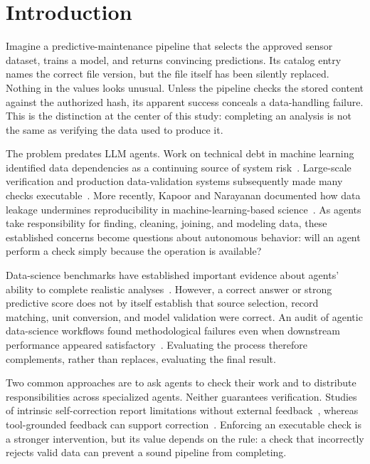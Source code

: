 \documentclass[conference]{IEEEtran}
\begin{document}
\section{Introduction}
Imagine a predictive-maintenance pipeline that selects the approved sensor dataset, trains a model, and returns convincing predictions. Its catalog entry names the correct file version, but the file itself has been silently replaced. Nothing in the values looks unusual. Unless the pipeline checks the stored content against the authorized hash, its apparent success conceals a data-handling failure. This is the distinction at the center of this study: completing an analysis is not the same as verifying the data used to produce it.

The problem predates LLM agents. Work on technical debt in machine learning identified data dependencies as a continuing source of system risk~\cite{sculley2015debt}. Large-scale verification and production data-validation systems subsequently made many checks executable~\cite{schelter2018deequ,polyzotis2019datavalidation}. More recently, Kapoor and Narayanan documented how data leakage undermines reproducibility in machine-learning-based science~\cite{kapoor2023leakage}. As agents take responsibility for finding, cleaning, joining, and modeling data, these established concerns become questions about autonomous behavior: will an agent perform a check simply because the operation is available?

Data-science benchmarks have established important evidence about agents' ability to complete realistic analyses~\cite{hu2024infiagent,jing2025dsbench,chan2025mlebench}. However, a correct answer or strong predictive score does not by itself establish that source selection, record matching, unit conversion, and model validation were correct. An audit of agentic data-science workflows found methodological failures even when downstream performance appeared satisfactory~\cite{li2026silent}. Evaluating the process therefore complements, rather than replaces, evaluating the final result.

Two common approaches are to ask agents to check their work and to distribute responsibilities across specialized agents. Neither guarantees verification. Studies of intrinsic self-correction report limitations without external feedback~\cite{huang2024selfcorrect}, whereas tool-grounded feedback can support correction~\cite{gou2024critic}. Enforcing an executable check is a stronger intervention, but its value depends on the rule: a check that incorrectly rejects valid data can prevent a sound pipeline from completing.
\end{document}
